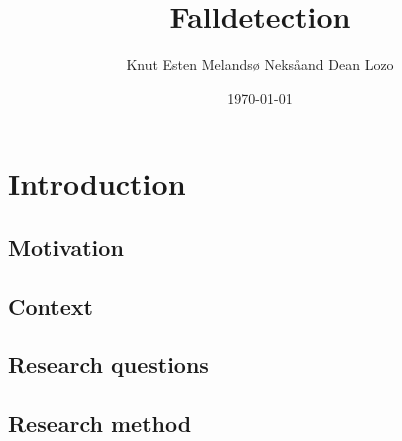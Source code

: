 \documentclass[11pt,twoside,a4paper]{report}
\begin{document}
\title{Falldetection}
\author{Knut Esten Melandsø Neks\aa and Dean Lozo}
\date{\today}
\maketitle

\begin{abstract}

\end{abstract}

\tableofcontents

\chapter{Introduction}

\section{Motivation}


\section{Context}

\section{Research questions}

\section{Research method}
\end{document}

